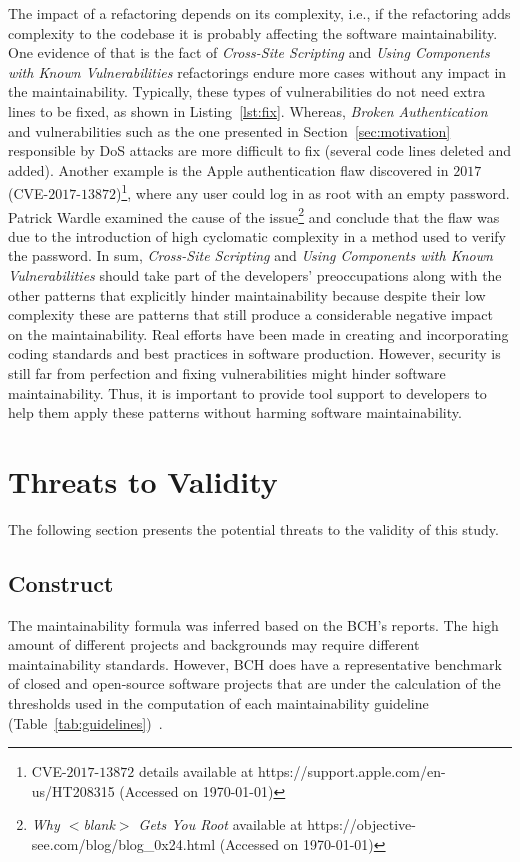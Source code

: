 \documentclass[10pt,conference]{IEEEtran}
\begin{document}
{The impact of a refactoring depends on its complexity, i.e., if the refactoring
adds complexity to the codebase it is probably affecting the software
maintainability. One evidence of that is the fact of \emph{Cross-Site Scripting}
and \emph{Using Components with Known Vulnerabilities} refactorings endure more
cases without any impact in the maintainability. Typically, these types of
vulnerabilities do not need extra lines to be fixed, as shown in
Listing~\ref{lst:fix}. Whereas, \emph{Broken Authentication} and vulnerabilities
such as the one presented in Section~\ref{sec:motivation} responsible by DoS
attacks are more difficult to fix (several code lines deleted and added).
Another example is the Apple authentication flaw discovered in $2017$
(CVE-$2017$-$13872$)\footnote{CVE-$2017$-$13872$ details available at
https://support.apple.com/en-us/HT208315 (Accessed on \today{})}, where any user
could log in as root with an empty password. Patrick Wardle examined the cause
of the issue\footnote{\emph{Why $<$blank$>$ Gets You Root} available at
https://objective-see.com/blog/blog\_0x24.html (Accessed on \today{})} and
conclude that the flaw was due to the introduction of high cyclomatic complexity
in a method used to verify the password. In sum, \emph{Cross-Site Scripting} and
\emph{Using Components with Known Vulnerabilities} should take part of the
developers' preoccupations along with the other patterns that explicitly hinder
maintainability because despite their low complexity these are patterns that
still produce a considerable negative impact on the maintainability. Real
efforts have been made in creating and incorporating coding standards and best
practices in software production. However, security is still far from perfection
and fixing vulnerabilities might hinder software maintainability. Thus, it is
important to provide tool support to developers to help them apply these
patterns without harming software maintainability.

\section{Threats to Validity}\label{sec:threats}
%
The following section presents the potential threats to the validity of this
study.
%
\subsection{Construct}
%
The maintainability formula was inferred based on the BCH's reports. The high
amount of different projects and backgrounds may require different
maintainability standards. However, BCH does have a representative benchmark of
closed and open-source software projects that are under the calculation of the
thresholds used in the computation of each maintainability guideline
(Table~\ref{tab:guidelines})~\cite{Visser:2016:OREILLY, Baggen2012}.

}
\end{document}
